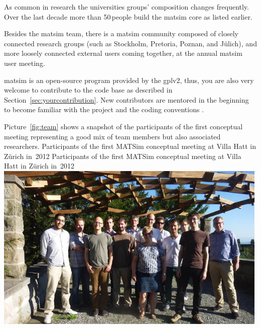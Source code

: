 As common in research the universities groups' composition changes frequently. Over the last decade more than 50\,people build the \gls{matsim} core as listed earlier.

Besides the \gls{matsim} team, there is a \gls{matsim} community composed of closely connected research groups (such as Stockholm, Pretoria, Poznan, and Jülich),
and more loosely connected external users coming together, \eg at the annual \gls{matsim} user meeting.   

\gls{matsim} is an open-source program provided by the \gls{gplv2}, thus, you are also very welcome to contribute to the code base as described in Section~\ref{sec:yourcontribution}. New contributors are mentored in the beginning \citep[][]{MATSIM-BecomingAContributor_Webpage_2015} to become familiar with the project and the coding conventions \citep[][]{MATSIM-CodingGuide_Webpage_2015}.

Picture~\ref{fig:team} shows a snapshot of the participants of the first conceptual meeting representing a good mix of team members but also associated researchers.
%
\createfigure%
{Participants of the first MATSim conceptual meeting at Villa Hatt in Zürich in~2012}%
{Participants of the first MATSim conceptual meeting at Villa Hatt in Zürich in~2012}%
{\label{fig:team}}%
{\includegraphics[width=0.99\textwidth, angle=0]{extending/figures/ConceptualMeetingVillaHatt.png}}%
{}

